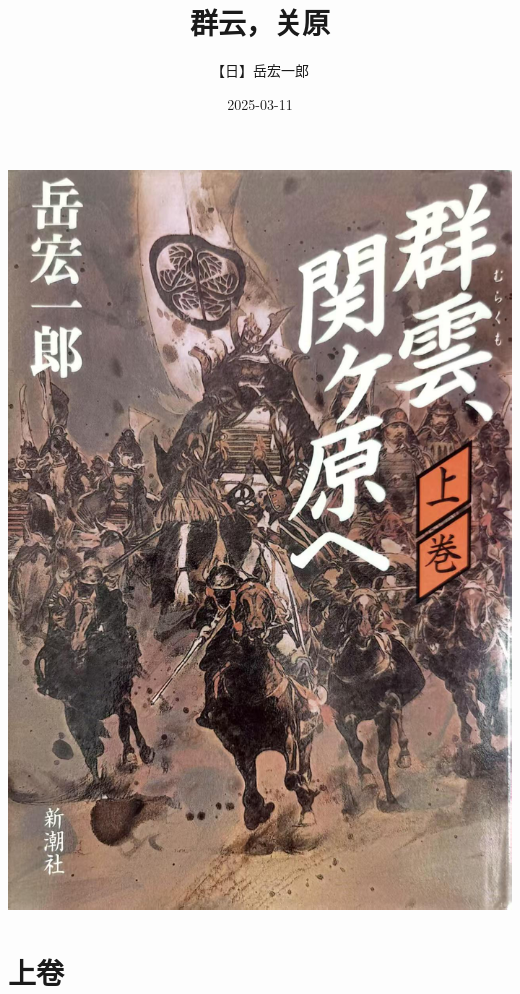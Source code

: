 \documentclass[
]{book}
\title{群云，关原}
\author{【日】岳宏一郎}
\date{2025-03-11}
\begin{document}
\maketitle

{
\setcounter{tocdepth}{1}
\tableofcontents
}
\chapter*{}\label{section}

\includegraphics[width=1\textwidth,height=\textheight]{image/cover.jpg}

\part*{上卷}\label{part-ux4e0aux5377}
\end{document}
